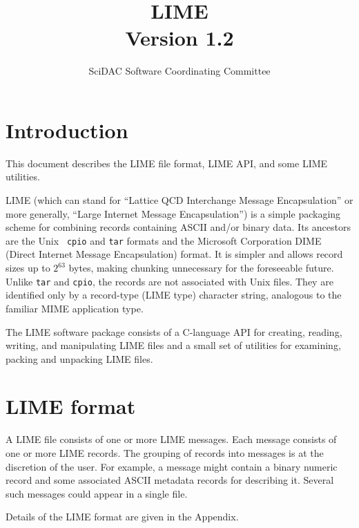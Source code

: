 \documentclass{article}
\begin{document}
\title{
   LIME \\{\large Version 1.2}
}
\author{ SciDAC Software Coordinating Committee}

\maketitle
\section{Introduction}

This document describes the LIME file format, LIME API, and some LIME
utilities.

LIME (which can stand for ``Lattice QCD Interchange Message
Encapsulation'' or more generally, ``Large Internet Message
Encapsulation'') is a simple packaging scheme for combining records
containing ASCII and/or binary data.  Its ancestors are the Unix {\tt
cpio} and {\tt tar} formats and the Microsoft Corporation DIME (Direct
Internet Message Encapsulation) format.  It is simpler and allows
record sizes up to $2^{63}$ bytes, making chunking unnecessary for the
foreseeable future.  Unlike {\tt tar} and {\tt cpio}, the records are
not associated with Unix files.  They are identified only by a
record-type (LIME type) character string, analogous to the familiar
MIME application type.

The LIME software package consists of a C-language API for creating,
reading, writing, and manipulating LIME files and a small set of
utilities for examining, packing and unpacking LIME files.

\section{LIME format}

A LIME file consists of one or more LIME messages.  Each message
consists of one or more LIME records.  The grouping of records into
messages is at the discretion of the user.  For example, a message
might contain a binary numeric record and some associated ASCII
metadata records for describing it.  Several such messages could
appear in a single file.

Details of the LIME format are given in the Appendix.
\end{document}

